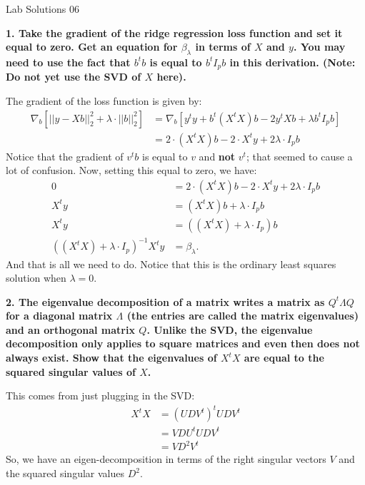 \documentclass[12pt,hidelinks]{article}
\numberwithin{equation}{section}
\begin{document}
{\LARGE Lab Solutions 06}

\vspace*{12pt}

\textbf{1. Take the gradient of the ridge regression loss function and set it equal
to zero. Get an equation for $\beta_{\lambda}$ in terms of $X$ and $y$. You may
need to use the fact that $b^t b$ is equal to $b^t I_p b$ in this derivation.
(Note: Do \textbf{not} yet use the SVD of $X$ here).}

\vspace*{12pt}

The gradient of the loss function is given by:
\begin{align}
\nabla_b \left[ || y - X b ||_2^2 + \lambda \cdot || b ||_2^2 \right] &=
\nabla_b \left[ y^t y + b^t (X^t X) b - 2 y^t X b + \lambda b^t I_p b \right] \\
&= 2 \cdot (X^t X) b - 2 \cdot X^t y + 2\lambda \cdot I_p b
\end{align}
Notice that the gradient of $v^t b$ is equal to $v$ and \textbf{not} $v^t$; that
seemed to cause a lot of confusion. Now, setting this equal to zero, we have:
\begin{align}
0 &= 2 \cdot (X^t X) b - 2 \cdot X^t y + 2\lambda \cdot I_p b \\
X^t y &= (X^t X) b + \lambda \cdot I_p b \\
X^t y &= \left((X^t X) + \lambda \cdot I_p \right) b \\
\left((X^t X) + \lambda \cdot I_p \right)^{-1} X^t y &= \beta_\lambda.
\end{align}
And that is all we need to do. Notice that this is the ordinary least squares
solution when $\lambda = 0$.


\vspace*{12pt}

\textbf{2. The eigenvalue decomposition of a matrix writes a matrix as $Q^t \Lambda Q$ for
a diagonal matrix $\Lambda$ (the entries are called the matrix eigenvalues) and an
orthogonal matrix $Q$. Unlike the SVD, the eigenvalue decomposition only applies to
square matrices and even then does not always exist. Show that the eigenvalues of
$X^t X$ are equal to the squared singular values of $X$.}

\vspace*{12pt}

This comes from just plugging in the SVD:
\begin{align}
X^t X &= (UDV^t)^{t} UDV^t \\
&= V D U^t U D V^t \\
&= V D^2 V^t
\end{align}
So, we have an eigen-decomposition in terms of the right singular vectors $V$
and the squared singular values $D^2$.
\end{document}
